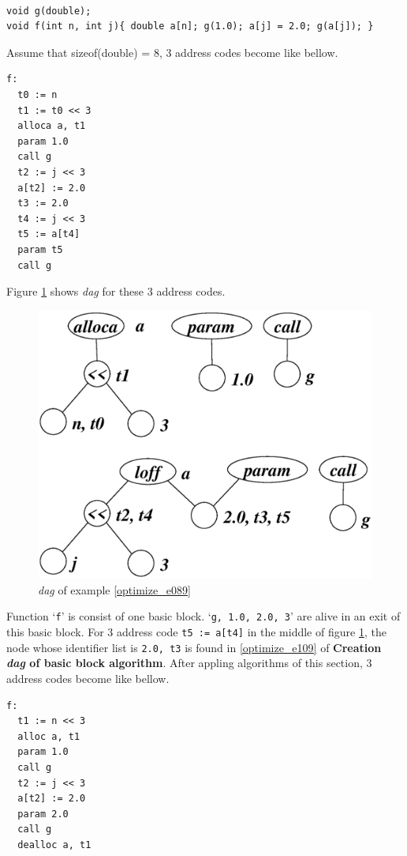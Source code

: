 \begin{Example}
\label{optimize_e089}
\begin{verbatim}

void g(double);
void f(int n, int j){ double a[n]; g(1.0); a[j] = 2.0; g(a[j]); }
\end{verbatim}
Assume that 
sizeof(double) = 8, 3 address codes become like bellow.
\begin{verbatim}
f:
  t0 := n
  t1 := t0 << 3
  alloca a, t1
  param 1.0
  call g
  t2 := j << 3
  a[t2] := 2.0
  t3 := 2.0
  t4 := j << 3
  t5 := a[t4]
  param t5
  call g
\end{verbatim}
Figure \ref{optimize_e090} shows {\em dag} for these 3 address codes.
\begin{figure}[htbp]
\begin{center}
\includegraphics[width=1.2\linewidth,height=1.0\linewidth]{opt038.eps}
\caption{{\em dag} of example \ref{optimize_e089}}
\label{optimize_e090}
\end{center}
\end{figure}
Function `{\tt{f}}' is consist of one basic block.
`{\tt{g, 1.0, 2.0, 3}}' are
alive in an exit of this basic block.
For 3 address code {\tt{t5 := a[t4]}} in the middle of
figure \ref{optimize_e090},
the node whose identifier list is {\tt{2.0, t3}} is found 
in \ref{optimize_e109} of {\bf Creation {\em dag} of basic block
 algorithm}.
After appling algorithms of this section,
3 address codes become like bellow.
\begin{verbatim}
f:
  t1 := n << 3
  alloc a, t1
  param 1.0
  call g
  t2 := j << 3
  a[t2] := 2.0
  param 2.0
  call g
  dealloc a, t1
\end{verbatim}
\end{Example}

